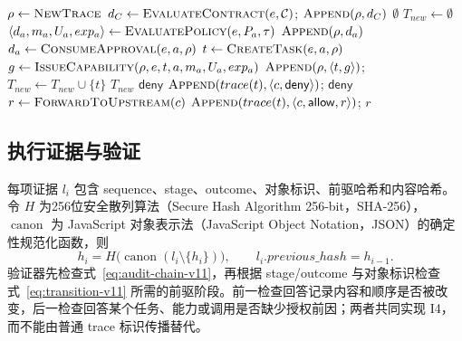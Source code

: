 \begin{algorithm}[htbp]
\caption{E2AG 双执行点跨层授权算法}
\label{alg:e2ag-v11}
\begin{algorithmic}[1]
  \State $\rho\gets\Call{NewTrace}{}$
  \State $d_C\gets\Call{EvaluateContract}{e,\mathcal{C}}$; $\Call{Append}{\rho,d_C}$
   \State \Return $\emptyset$ \EndIf
  \State $T_{new}\gets\emptyset$
    \State $\langle d_a,m_a,U_a,exp_a\rangle\gets\Call{EvaluatePolicy}{e,P_a,\tau}$
    \State $\Call{Append}{\rho,d_a}$
      \State $d_a\gets\Call{ConsumeApproval}{e,a,\rho}$
    \EndIf
      \State $t\gets\Call{CreateTask}{e,a,\rho}$
      \State $g\gets\Call{IssueCapability}{\rho,e,t,a,m_a,U_a,exp_a}$
      \State $\Call{Append}{\rho,\langle t,g\rangle}$; $T_{new}\gets T_{new}\cup\{t\}$
    \EndIf
  \EndFor
  \State \Return $T_{new}$
\EndProcedure
{}
   \State \Return $\mathsf{deny}$ \EndIf
    \State $\Call{Append}{trace(t),\langle c,\mathsf{deny}\rangle}$; \Return $\mathsf{deny}$
  \EndIf
  \State $r\gets\Call{ForwardToUpstream}{c}$
  \State $\Call{Append}{trace(t),\langle c,\mathsf{allow},r\rangle}$; \Return $r$
\EndProcedure
\end{algorithmic}
\end{algorithm}

\subsection{执行证据与验证}

每项证据 $l_i$ 包含 sequence、stage、outcome、对象标识、前驱哈希和内容哈希。令 $H$ 为256位安全散列算法（Secure Hash Algorithm 256-bit，SHA-256），$\operatorname{canon}$ 为 JavaScript 对象表示法（JavaScript Object Notation，JSON）的确定性规范化函数，则
\begin{equation}
h_i=H\bigl(\operatorname{canon}(l_i\setminus\{h_i\})\bigr),\qquad
l_i.previous\_hash=h_{i-1}.
\label{eq:audit-chain-v11}
\end{equation}
验证器先检查式~\eqref{eq:audit-chain-v11}，再根据 stage/outcome 与对象标识检查式~\eqref{eq:transition-v11} 所需的前驱阶段。前一检查回答记录内容和顺序是否被改变，后一检查回答某个任务、能力或调用是否缺少授权前因；两者共同实现 I4，而不能由普通 trace 标识传播替代。

